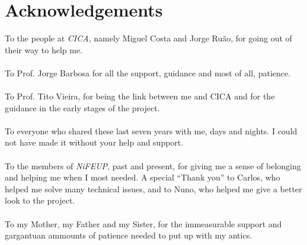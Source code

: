 \chapter*{Acknowledgements}

To the people at \emph{CICA}, namely Miguel Costa and Jorge Ruão, for going out of their way to help me.\\
\ \\
To Prof. Jorge Barbosa for all the support, guidance and most of all, patience.\\
\ \\
To Prof. Tito Vieira, for being the link between me and CICA and for the guidance in the early stages of the project.\\
\ \\
To everyone who shared these last seven years with me, days and nights. I could not have made it without your help and support.\\
\ \\
To the members of \emph{NiFEUP}, past and present, for giving me a sense of belonging and helping me when I most needed. A special ``Thank you'' to Carlos, who helped me solve many technical issues, and to Nuno, who helped me give a better look to the project.  \\
\ \\
To my Mother, my Father and my Sister, for the immeasurable support and gargantuan ammounts of patience needed to put up with my antics.

\vspace{10mm}
